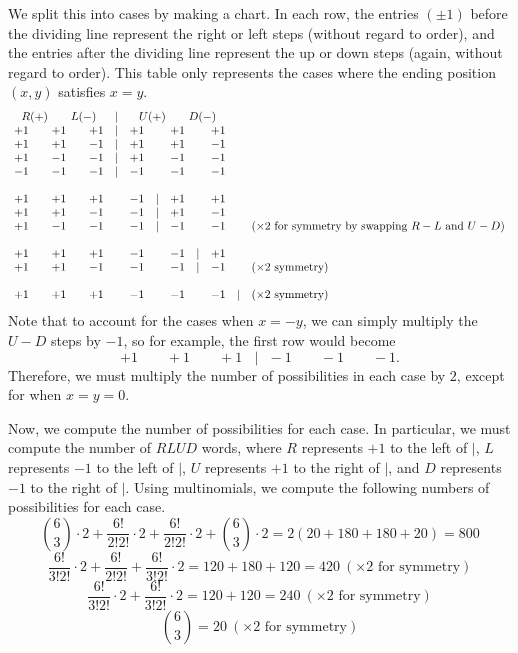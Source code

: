 \begin{enumerate}
We split this into cases by making a chart. In each row, the entries $(\pm1)$ before the dividing line represent the right or left steps (without regard to order), and the entries after the dividing line represent the up or down steps (again, without regard to order). This table only represents the cases where the ending position $(x,y)$ satisfies $x=y$.
 \[\begin{array}{ccccccccccccl} \multicolumn{5}{c}{R (+)\qquad L (-)}& |&\multicolumn{5}{c}{U (+)\qquad D (-)}\\ +1&&  +1&&  +1&| &  +1&&  +1&&  +1\\ +1&& +1&& -1& | & +1&& +1&& -1\\ +1&& -1&&  -1& | & +1&& -1&& -1\\ -1 && -1&&  -1& |  & -1&&  -1&& -1\\ \\ +1&& +1&& +1&& -1 &|& +1&& +1\\ +1&& +1&& -1 && -1 &|& +1 && -1\\ +1&& -1&&  -1 && -1 &|& -1 &&  -1 &&(\times 2 \text{ for symmetry by swapping }R-L\text{ and }U-D)\\ \\ +1&& +1 &&+1 &&-1&& -1& |& +1\\ +1&& +1 &&-1&&  -1&& -1 &|& -1&& (\times 2\text{ symmetry})\\ \\ +1&& +1 &&+1&& -1&& -1 &&-1&| & (\times2 \text{ symmetry})\\ \end{array}\]Note that to account for the cases when $x=-y$, we can simply multiply the $U-D$ steps by $-1$, so for example, the first row would become  
 \[+1 \qquad+1\qquad +1 \ \ \ \ |\ \ \  -1\qquad -1\qquad -1.\] Therefore, we must multiply the number of possibilities in each case by $2$, except for when $x=y=0$.

 Now, we compute the number of possibilities for each case. In particular, we must compute the number of $RLUD$ words, where $R$ represents $+1$ to the left of $|$, $L$ represents $-1$ to the left of $|$, $U$ represents $+1$ to the right of $|$, and $D$ represents $-1$ to the right of $|$. Using multinomials, we compute the following numbers of possibilities for each case.
 \[{6\choose 3}\cdot  2+ \frac{6!}{2!2!}\cdot 2 + \frac{6!}{2!2!} \cdot 2 + {6\choose 3} \cdot 2 = 2(20 + 180 + 180 + 20) = 800\]
 \[\frac{6!}{3!2!}\cdot 2 + \frac{6!}{2!2!} + \frac{6!}{3!2!}\cdot 2 = 120 + 180 + 120 = 420\  (\times2\text{ for symmetry})\]
 \[\frac{6!}{3!2!} \cdot 2 + \frac{6!}{3!2!} \cdot 2 = 120 + 120 = 240\  (\times2\text{ for symmetry})\]
 \[{6\choose 3} = 20\ (\times 2\text{ for symmetry})\]


\end{enumerate}
